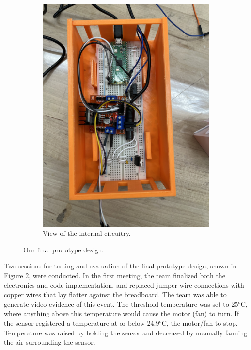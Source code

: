 \documentclass[11pt]{article}
\begin{document}
\begin{figure}
\begin{subfigure}{0.34\textwidth}
        \includegraphics[width=\linewidth]{finalPrototypeInside}
        \caption{View of the internal circuitry.}
        \label{finalPrototypeInside}
      \end{subfigure}
    \caption{Our final prototype design.}
    \label{finalPrototype}
\end{figure}

Two sessions for testing and evaluation of the final prototype design, shown in Figure \ref{finalPrototype}, were conducted. 
In the first meeting, the team finalized both the electronics and code implementation, and replaced jumper wire connections with copper wires that lay flatter against the breadboard. The team was able to generate video evidence of this event. The threshold temperature was set to 25°C, where anything above this temperature would cause the motor (fan) to turn. If the sensor registered a temperature at or below 24.9°C, the motor/fan to stop. Temperature was raised by holding the sensor and decreased by manually fanning the air surrounding the sensor.
\end{document}
